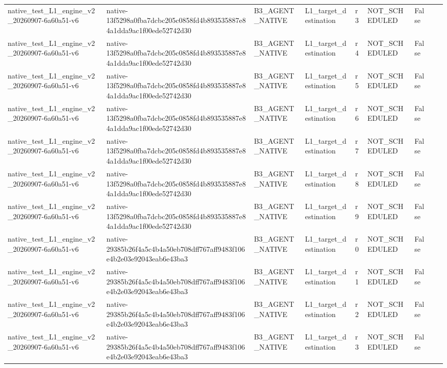 \begin{tabular}{lllllllll}
native\_test\_L1\_engine\_v2\_20260907-6a60a51-v6 & native-13f5298a0fba7dcbc205c0858fd4b893535887e84a1dda9ac1f00ede52742d30 & B3\_AGENT\_NATIVE & L1\_target\_destination & r3 & NOT\_SCHEDULED & False &  &  \\
native\_test\_L1\_engine\_v2\_20260907-6a60a51-v6 & native-13f5298a0fba7dcbc205c0858fd4b893535887e84a1dda9ac1f00ede52742d30 & B3\_AGENT\_NATIVE & L1\_target\_destination & r4 & NOT\_SCHEDULED & False &  &  \\
native\_test\_L1\_engine\_v2\_20260907-6a60a51-v6 & native-13f5298a0fba7dcbc205c0858fd4b893535887e84a1dda9ac1f00ede52742d30 & B3\_AGENT\_NATIVE & L1\_target\_destination & r5 & NOT\_SCHEDULED & False &  &  \\
native\_test\_L1\_engine\_v2\_20260907-6a60a51-v6 & native-13f5298a0fba7dcbc205c0858fd4b893535887e84a1dda9ac1f00ede52742d30 & B3\_AGENT\_NATIVE & L1\_target\_destination & r6 & NOT\_SCHEDULED & False &  &  \\
native\_test\_L1\_engine\_v2\_20260907-6a60a51-v6 & native-13f5298a0fba7dcbc205c0858fd4b893535887e84a1dda9ac1f00ede52742d30 & B3\_AGENT\_NATIVE & L1\_target\_destination & r7 & NOT\_SCHEDULED & False &  &  \\
native\_test\_L1\_engine\_v2\_20260907-6a60a51-v6 & native-13f5298a0fba7dcbc205c0858fd4b893535887e84a1dda9ac1f00ede52742d30 & B3\_AGENT\_NATIVE & L1\_target\_destination & r8 & NOT\_SCHEDULED & False &  &  \\
native\_test\_L1\_engine\_v2\_20260907-6a60a51-v6 & native-13f5298a0fba7dcbc205c0858fd4b893535887e84a1dda9ac1f00ede52742d30 & B3\_AGENT\_NATIVE & L1\_target\_destination & r9 & NOT\_SCHEDULED & False &  &  \\
native\_test\_L1\_engine\_v2\_20260907-6a60a51-v6 & native-29385b26f4a5c4b4a50eb708dff767aff9483f106e4b2e03e92043eab6e43ba3 & B3\_AGENT\_NATIVE & L1\_target\_destination & r0 & NOT\_SCHEDULED & False &  &  \\
native\_test\_L1\_engine\_v2\_20260907-6a60a51-v6 & native-29385b26f4a5c4b4a50eb708dff767aff9483f106e4b2e03e92043eab6e43ba3 & B3\_AGENT\_NATIVE & L1\_target\_destination & r1 & NOT\_SCHEDULED & False &  &  \\
native\_test\_L1\_engine\_v2\_20260907-6a60a51-v6 & native-29385b26f4a5c4b4a50eb708dff767aff9483f106e4b2e03e92043eab6e43ba3 & B3\_AGENT\_NATIVE & L1\_target\_destination & r2 & NOT\_SCHEDULED & False &  &  \\
native\_test\_L1\_engine\_v2\_20260907-6a60a51-v6 & native-29385b26f4a5c4b4a50eb708dff767aff9483f106e4b2e03e92043eab6e43ba3 & B3\_AGENT\_NATIVE & L1\_target\_destination & r3 & NOT\_SCHEDULED & False &  &  \\

\end{tabular}
